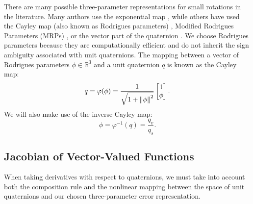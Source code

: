 \documentclass[letterpaper, 10 pt, conference]{ieeeconf}  %
\newcommand{\R}{\mathbb{R}}
\begin{document}
        There are many possible three-parameter representations for small rotations in
        the literature. Many authors use the exponential map \cite{Baillieul1978,
        Zefran1998, Lee2008, Saccon2013, Sola2017, Fan2016, watterson2018trajectory},
        while others have used the Cayley map (also known as Rodrigues parameters)
        \cite{Kobilarov2011, Kobilarov2014}, Modified Rodrigues Parameters (MRPs)
        \cite{Terzakis2018}, or the vector part of the quaternion \cite{Fresk2013}.
        We choose Rodrigues parameters \cite{markley2014fundamentals} because they are
        computationally efficient and do not inherit the sign ambiguity associated with
        unit quaternions. The mapping between a vector of Rodrigues parameters $\phi \in
        \R^3$ and a unit quaternion $q$ is known as the Cayley map: \begin{equation}
        \label{eq:cayley}
            q = \varphi(\phi) = \frac{1}{\sqrt{1 + \norm{\phi}^2}} \begin{bmatrix} 1 \\ \phi \end{bmatrix}.
        \end{equation}
        We will also make use of the inverse Cayley map:
        \begin{equation}
            \phi = \varphi^{-1}(q) = \frac{q_v}{q_s}.
        \end{equation}

    \subsection{Jacobian of Vector-Valued Functions}
        When taking derivatives with respect to quaternions, we must take into account
        both the composition rule and the nonlinear mapping between the space of unit
        quaternions and our chosen three-parameter error representation.
\end{document}
